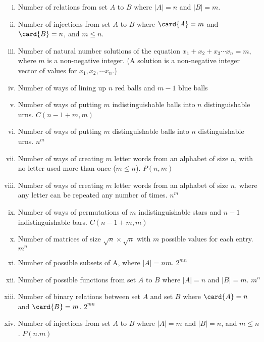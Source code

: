 \begin{problem}
\begin{enumerate}[(i)]
\item Number of relations from set $A$ to $B$ where $|A|=n$ and $|B|=m$.

\item Number of injections from set $A$ to $B$ where $\card{A}=m$ and
$\card{B}=n$, and $m \leq n$.

\item Number of natural number solutions of the equation $x_1 + x_2 + x_3
\cdots x_n = m$, where $m$ is a non-negative integer.  (A solution is
a non-negative integer vector of values for $x_1,x_2,\cdots x_n$.)

\item Number of ways of lining up $n$ red balls and $m-1$ blue balls


\item
Number of ways of putting $m$ indistinguishable balls into $n$
distinguishable urns. $C(n-1+m,m)$

\item Number of ways of putting $m$ distinguishable balls into $n$
distinguishable urns. $n^m$

\item Number of ways of creating $m$ letter words from an alphabet of size $n$,
with no letter used more than once ($m \leq n$). $P(n,m)$

\item Number of ways of creating $m$ letter words from an alphabet of size $n$,
where any letter can be repeated any number of times. $n^m$

\item Number of ways of permutations of $m$ indistinguishable stars and
$n-1$ indistinguishable bars. $C(n-1+m,m)$

\item Number of matrices of size $\sqrt{n} \times \sqrt{n}$ with
$m$ possible values for each entry. $m^n$

\item Number of possible subsets of A, where $|A|=nm$. $2^{mn}$

\item Number of possible functions from set $A$ to $B$ where $|A|=n$ and
$|B|=m$. $m^n$

\item Number of binary relations between set $A$ and set $B$ where $\card{A}=n$ and
$\card{B}=m$. $2^{mn}$

\item Number of injections from set $A$ to $B$ where $|A|=m$ and $|B|=n$,
and $m \leq n$. $P(n.m)$


\end{enumerate}
\end{problem}
